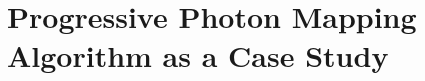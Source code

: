 \documentclass[main.tex]{subfiles}
\begin{document}
\chapter{Progressive Photon Mapping Algorithm as a Case Study} \label{chapter:case_study}






\end{document}
